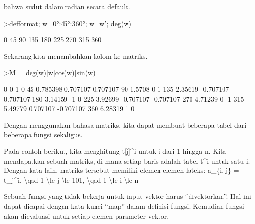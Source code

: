 \documentclass{article}
\begin{document}
\begin{eulernotebook}
\begin{eulercomment}
bahwa sudut dalam radian secara default.
\end{eulercomment}
\begin{eulerprompt}
>defformat; w=0°:45°:360°; w=w'; deg(w)
\end{eulerprompt}
\begin{euleroutput}
              0 
             45 
             90 
            135 
            180 
            225 
            270 
            315 
            360 
\end{euleroutput}
\begin{eulercomment}
Sekarang kita menambahkan kolom ke matriks.
\end{eulercomment}
\begin{eulerprompt}
>M = deg(w)|w|cos(w)|sin(w)
\end{eulerprompt}
\begin{euleroutput}
              0             0             1             0 
             45      0.785398      0.707107      0.707107 
             90        1.5708             0             1 
            135       2.35619     -0.707107      0.707107 
            180       3.14159            -1             0 
            225       3.92699     -0.707107     -0.707107 
            270       4.71239             0            -1 
            315       5.49779      0.707107     -0.707107 
            360       6.28319             1             0 
\end{euleroutput}
\begin{eulercomment}
Dengan menggunakan bahasa matriks, kita dapat membuat beberapa tabel
dari beberapa fungsi sekaligus.


Pada contoh berikut, kita menghitung t[j]\textasciicircum{}i untuk i dari 1 hingga n.
Kita mendapatkan sebuah matriks, di mana setiap baris adalah tabel t\textasciicircum{}i
untuk satu i. Dengan kata lain, matriks tersebut memiliki
elemen-elemen lateks: a\_\{i, j\} = t\_j\textasciicircum{}i, \textbackslash{}qad 1 \textbackslash{}le j \textbackslash{}le 101, \textbackslash{}qad 1
\textbackslash{}le i \textbackslash{}le n


Sebuah fungsi yang tidak bekerja untuk input vektor harus
“divektorkan”. Hal ini dapat dicapai dengan kata kunci “map” dalam
definisi fungsi. Kemudian fungsi akan dievaluasi untuk setiap elemen
parameter vektor.



\end{eulercomment}
\end{eulernotebook}
\end{document}
